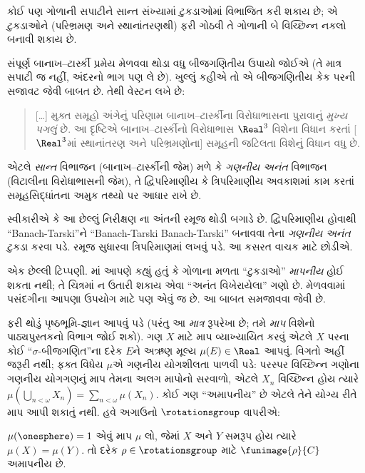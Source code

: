 \begin{thm}
કોઈ પણ ગોળાની સપાટીને
સાન્ત સંખ્યામાં ટુકડાઓમાં
વિભાજિત કરી શકાય છે; એ
ટુકડાઓને (પરિભ્રમણ અને
સ્થાનાંતરણથી) ફરી ગોઠવી
તે ગોળાની બે વિચ્છિન્ન
નકલો બનાવી શકાય છે.
\end{thm}

સંપૂર્ણ બાનાખ--ટાર્સ્કી પ્રમેય
મેળવવા થોડા વધુ બીજગણિતીય
ઉપાયો જોઈએ (તે માત્ર સપાટી
જ નહીં, અંદરનો ભાગ પણ લે છે).
ખુલ્લું કહીએ તો એ બીજગણિતીય
કેક પરની સજાવટ જેવી બાબત છે.
તેથી વેસ્ટન લખે છે:
\begin{quote}
  [\ldots] મુક્ત સમૂહો અંગેનું
  પરિણામ બાનાખ--ટાર્સ્કીના
  વિરોધાભાસના પુરાવાનું
  \emph{મુખ્ય પગલું} છે. આ
  દૃષ્ટિએ બાનાખ--ટાર્સ્કીનો
  વિરોધાભાસ $\Real^3$ વિશેના
  વિધાન કરતાં [$\Real^3$માં
  સ્થાનાંતરણ અને પરિભ્રમણોના]
  સમૂહની જટિલતા વિશેનું
  વિધાન વધુ છે.
  \cite[p.~16]{Weston2003}
\end{quote}
એટલે \emph{સાન્ત} વિભાજન
(બાનાખ--ટાર્સ્કીની જેમ) મળે
કે \emph{ગણનીય અનંત} વિભાજન
(વિટાલીના વિરોધાભાસની જેમ),
તે દ્વિપરિમાણીય કે ત્રિપરિમાણીય
અવકાશમાં કામ કરતાં સમૂહસિદ્ધાંતના
અમુક તથ્યો પર આધાર રાખે છે.

સ્વીકારીએ કે આ છેલ્લું નિરીક્ષણ
ના અંતની
રમૂજ થોડી બગાડે છે. દ્વિપરિમાણીય
હોવાથી ``Banach-Tarski''ને
``Banach-Tarski Banach-Tarski''
બનાવવા તેના \emph{ગણનીય અનંત}
ટુકડા કરવા પડે. રમૂજ સુધારવા
ત્રિપરિમાણમાં લખવું પડે.
આ કસરત વાચક માટે છોડીએ.

એક છેલ્લી ટિપ્પણી.
માં આપણે કહ્યું
હતું કે ગોળાના મળતા ``ટુકડાઓ''
\emph{માપનીય} હોઈ શકતા નથી;
તે ચિત્રમાં ન ઉતારી શકાય એવા
``અનંત વિખેરાયેલા'' ગણો છે.
મેળવવામાં પસંદગીના આપણા
ઉપયોગ માટે પણ એવું જ છે.
આ બાબત સમજાવવા જેવી છે.

ફરી થોડું પૃષ્ઠભૂમિ-જ્ઞાન
આપવું પડે (પરંતુ આ
\emph{માત્ર} રૂપરેખા છે; તમે
\emph{માપ} વિશેનો પાઠ્યપુસ્તકનો
વિભાગ જોઈ શકો). ગણ $X$ માટે
માપ વ્યાખ્યાયિત કરવું એટલે
$X$ પરના કોઈ ``$\sigma$-બીજગણિત''ના
દરેક $E$ને અઋણ મૂલ્ય
$\mu(E) \in \Real$ આપવું.
વિગતો અહીં જરૂરી નથી;
ફક્ત વિધેય $\mu$એ ગણનીય
યોગશીલતા પાળવી પડે: પરસ્પર
વિચ્છિન્ન ગણોના ગણનીય યોગગણનું
માપ તેમના અલગ માપોનો સરવાળો,
એટલે $X_n$ વિચ્છિન્ન હોય ત્યારે
$\mu(\bigcup_{n < \omega} X_n) =
\sum_{n < \omega}\mu(X_n)$.
કોઈ ગણ ``અમાપનીય'' છે એટલે
તેને યોગ્ય રીતે માપ આપી
શકાતું નથી. હવે અગાઉનો
$\rotationsgroup$ વાપરીએ:

\begin{cor}[વિટાલી]
$\mu(\onesphere) = 1$ એવું
માપ $\mu$ લો, જેમાં $X$ અને
$Y$ સમરૂપ હોય ત્યારે
$\mu(X) = \mu(Y)$. તો દરેક
$\rho \in \rotationsgroup$ માટે
$\funimage{\rho}{C}$ અમાપનીય છે.
\end{cor}

